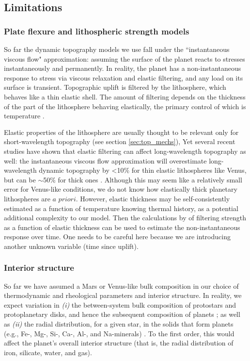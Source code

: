 \subsection{Limitations}

\subsubsection{Plate flexure and lithospheric strength models} \label{sec:future-elastic}

So far the dynamic topography models we use fall under the ``instantaneous viscous flow" approximation: assuming the surface of the planet reacts to stresses instantaneously and permanently. In reality, the planet has a non-instantaneous response to stress via viscous relaxation and elastic filtering, and any load on its surface is transient. Topographic uplift is filtered by the lithosphere, which behaves like a thin elastic shell. The amount of filtering depends on the thickness of the part of the lithosphere behaving elastically, the primary control of which is temperature \citep{Watts2001}.

Elastic properties of the lithosphere are usually thought to be relevant only for short-wavelength topography (see section \ref{sec:top_mechs}), Yet several recent studies have shown that elastic filtering can affect long-wavelength topography as well: the instantaneous viscous flow approximation will overestimate long-wavelength dynamic topography by \textless10\% for thin elastic lithospheres like Venus, but can be $\sim$50\% for thick ones \citep{Zhong2002, Golle2012, Dumoulin2013}. Although this may seem like a relatively small error for Venus-like conditions, we do not know how elastically thick planetary lithospheres are $\textit{a priori}$. However, elastic thickness may be self-consistently estimated as a function of temperature knowing thermal history, as a potential additional complexity to our model. Then the calculations by \citet{Golle2012} of filtering strength as a function of elastic thickness can be used to estimate the non-instantaneous response over time. One needs to be careful here because we are introducing another unknown variable (time since uplift).

\subsubsection{Interior structure}\label{sec:future-exoticplanets}

So far we have assumed a Mars or Venus-like bulk composition in our choice of thermodynamic and rheological parameters and interior structure. In reality, we expect variation in \textit{(i)} the between-system bulk composition of protostars and protoplanetary disks, and hence the subsequent composition of planets \citep{Bitsch2020}; as well as \textit{(ii)} the radial distribution, for a given star, in the solids that form planets (e.g., Fe-, Mg-, Si-, Ca-, Al-, and Na-minerals) \citep{Dorn2019, Miyazaki2020}. To the first order, this would affect the planet's overall interior structure (that is, the radial distribution of iron, silicate, water, and gas).

